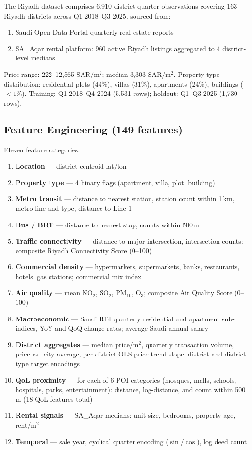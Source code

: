 \documentclass[11pt, a4paper, twoside]{article}
\begin{document}
The Riyadh dataset comprises 6,910 district-quarter observations covering 163
Riyadh districts across Q1 2018--Q3 2025, sourced from:
\begin{enumerate}
  \item Saudi Open Data Portal quarterly real estate reports
  \item SA\_Aqar rental platform: 960 active Riyadh listings aggregated to
        4 district-level medians
\end{enumerate}

Price range: 222--12,565 SAR/m$^2$; median 3,303 SAR/m$^2$. Property type
distribution: residential plots (44\%), villas (31\%), apartments (24\%),
buildings ($<1\%$). Training: Q1 2018--Q4 2024 (5,531 rows); holdout:
Q1--Q3 2025 (1,730 rows).

\subsection{Feature Engineering (149 features)}
Eleven feature categories:
\begin{enumerate}
  \item \textbf{Location} --- district centroid lat/lon
  \item \textbf{Property type} --- 4 binary flags (apartment, villa, plot, building)
  \item \textbf{Metro transit} --- distance to nearest station, station count within 1\,km,
        metro line and type, distance to Line 1
  \item \textbf{Bus / BRT} --- distance to nearest stop, counts within 500\,m
  \item \textbf{Traffic connectivity} --- distance to major intersection, intersection
        counts; composite Riyadh Connectivity Score (0--100)
  \item \textbf{Commercial density} --- hypermarkets, supermarkets, banks, restaurants,
        hotels, gas stations; commercial mix index
  \item \textbf{Air quality} --- mean NO$_2$, SO$_2$, PM$_{10}$, O$_3$; composite
        Air Quality Score (0--100)
  \item \textbf{Macroeconomic} --- Saudi REI quarterly residential and apartment
        sub-indices, YoY and QoQ change rates; average Saudi annual salary
  \item \textbf{District aggregates} --- median price/m$^2$, quarterly transaction
        volume, price vs.\ city average, per-district OLS price trend slope,
        district and district-type target encodings
  \item \textbf{QoL proximity} --- for each of 6 POI categories (mosques, malls, schools,
        hospitals, parks, entertainment): distance, log-distance, and count
        within 500\,m (18 QoL features total)
  \item \textbf{Rental signals} --- SA\_Aqar medians: unit size, bedrooms, property age,
        rent/m$^2$
  \item \textbf{Temporal} --- sale year, cyclical quarter encoding ($\sin$/$\cos$), log
        deed count
\end{enumerate}
\end{document}
